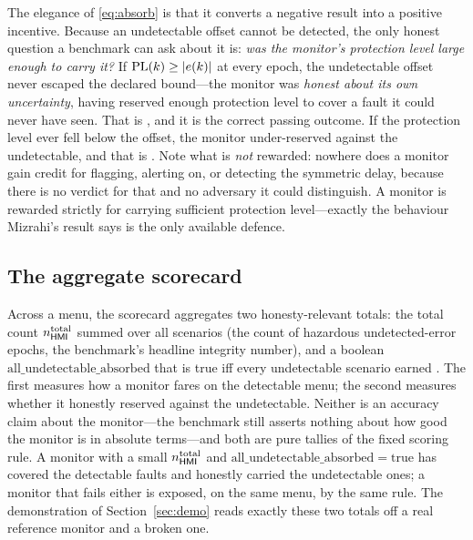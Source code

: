 The elegance of \eqref{eq:absorb} is that it converts a negative result into a
positive incentive. Because an undetectable offset cannot be detected, the only
honest question a benchmark can ask about it is: \emph{was the monitor's protection
level large enough to carry it?} If $\mathrm{PL}(k)\ge|e(k)|$ at every epoch, the
undetectable offset never escaped the declared bound---the monitor was
\emph{honest about its own uncertainty}, having reserved enough protection level to
cover a fault it could never have seen. That is \Absorbed{}, and it is the correct
passing outcome. If the protection level ever fell below the offset, the monitor
under-reserved against the undetectable, and that is \Unabsorbed{}. Note what is
\emph{not} rewarded: nowhere does a monitor gain credit for flagging, alerting on,
or detecting the symmetric delay, because there is no verdict for that and no
adversary it could distinguish. A monitor is rewarded strictly for carrying
sufficient protection level---exactly the behaviour Mizrahi's result says is the
only available defence.

\subsection{The aggregate scorecard}
\label{sec:aggregate}

Across a menu, the scorecard aggregates two honesty-relevant totals: the total
\HMI{} count $n_{\textsf{HMI}{}}^{\text{total}}$ summed over all scenarios (the count of
hazardous undetected-error epochs, the benchmark's headline integrity number), and
a boolean $\mathrm{all\_undetectable\_absorbed}$ that is true iff every
undetectable scenario earned \Absorbed{}. The first measures how a monitor fares on
the detectable menu; the second measures whether it honestly reserved against the
undetectable. Neither is an accuracy claim about the monitor---the benchmark still
asserts nothing about how good the monitor is in absolute terms---and both are pure
tallies of the fixed scoring rule. A monitor with a small
$n_{\textsf{HMI}{}}^{\text{total}}$ and $\mathrm{all\_undetectable\_absorbed}=\text{true}$
has covered the detectable faults and honestly carried the undetectable ones; a
monitor that fails either is exposed, on the same menu, by the same rule. The
demonstration of Section~\ref{sec:demo} reads exactly these two totals off a real
reference monitor and a broken one.
